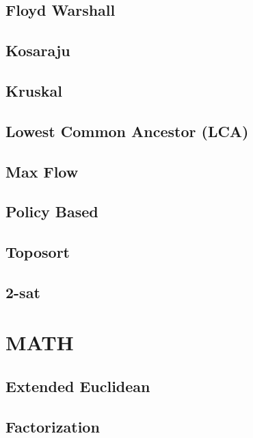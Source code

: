\subsection{Floyd Warshall}
\raggedbottom
\hrulefill
\subsection{Kosaraju}
\raggedbottom
\hrulefill
\subsection{Kruskal}
\raggedbottom
\hrulefill
\subsection{Lowest Common Ancestor (LCA)}
\raggedbottom
\hrulefill
\subsection{Max Flow}
\raggedbottom
\hrulefill
\subsection{Policy Based}
\raggedbottom
\hrulefill
\subsection{Toposort}
\raggedbottom
\hrulefill
\subsection{2-sat}
\raggedbottom
\hrulefill

\section{MATH}
\subsection{Extended Euclidean}
\raggedbottom
\hrulefill
\subsection{Factorization}
\raggedbottom
\hrulefill
